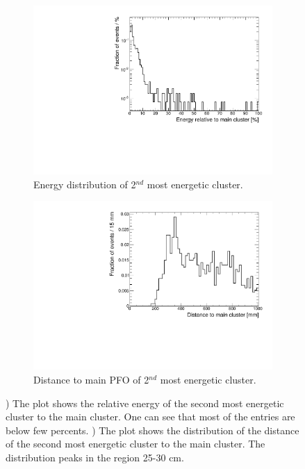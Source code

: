 \begin{figure}[htbp!]
  \centering
  \begin{subfigure}[t]{0.49\textwidth}
    \centering
    \includegraphics[width=1\linewidth]{chap6/fig_TimingILD/AdditionalPlots/Energy2ndCluster_100ns_50GeV}
    \caption{Energy distribution of 2$^{nd}$ most energetic cluster.} \label{fig:Energy2ndCluster}
  \end{subfigure}
  \hfill
  \begin{subfigure}[t]{0.49\textwidth}
    \centering
    \includegraphics[width=1\linewidth]{chap6/fig_TimingILD/AdditionalPlots/Distance2ndCluster_100ns_50GeV}
    \caption{Distance to main PFO of 2$^{nd}$ most energetic cluster.} \label{fig:Distance2ndCluster}
  \end{subfigure}
  \caption{) The plot shows the relative energy of the second most energetic cluster to the main cluster. One can see that most of the entries are below few percents. ) The plot shows the distribution of the distance of the second most energetic cluster to the main cluster. The distribution peaks in the region 25-30 cm.}
\end{figure}

